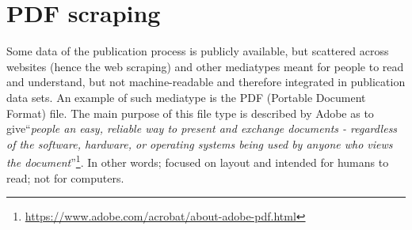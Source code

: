 \documentclass{ou-report}
\begin{document}


        
\section{PDF scraping}
\label{gen_impl:pdf_scraping}
Some data of the publication process is publicly available, but scattered 
across websites (hence the web scraping) and other mediatypes meant for people 
to read and understand, but not machine-readable and therefore integrated in 
publication data sets. An example of such mediatype is the PDF (Portable Document 
Format) file. The main purpose
of this file type is described by Adobe as to give``\textit{people an easy, reliable
way to present and exchange documents - regardless of the software, hardware, or
operating systems being used by anyone who views the
document}''\footnote{\url{https://www.adobe.com/acrobat/about-adobe-pdf.html}}. 
In other words; focused on layout and intended for humans to read; not for
computers. 
\end{document}
